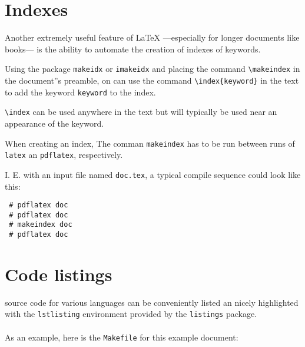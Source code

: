 \documentclass{article}
\begin{document}
\section{Indexes}

Another extremely useful feature of  {\LaTeX} ---especially for longer documents like books--- is the ability to automate the creation of indexes of keywords.

Using the package \verb+makeidx+ or \verb+imakeidx+ and placing the  command  \verb+\makeindex+ in the document''s preamble, on can use the command \verb+\index{keyword}+ in the text to add the keyword  \texttt{keyword} to the index.

\verb+\index+ can be used anywhere in the text but will typically be used near an  appearance of the keyword.

When creating an index,  The comman \verb+makeindex+ has to be run between runs of \verb+latex+ an \verb+pdflatex+, respectively.

I. E. with an input file named \verb+doc.tex+, a typical compile sequence could look like this:



\begin{lstlisting}
 # pdflatex doc
 # pdflatex doc
 # makeindex doc
 # pdflatex doc
\end{lstlisting}


\section{Code listings}

source code for various languages  can be conveniently listed an nicely highlighted with the \verb+lstlisting+ environment provided by the \verb+listings+ package.


 \paragraph{} As an example, here is the \verb+Makefile+ for this example document:
\end{document}
